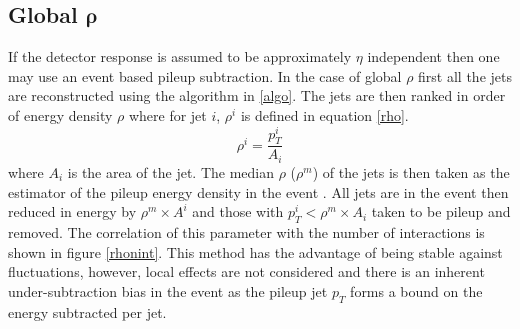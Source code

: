 \subsection{Global $\boldsymbol{\rho}$}
If the detector response is assumed 
to be approximately $\eta$ independent then one may use an event based pileup subtraction. In 
the case of global $\rho$ first all the jets are reconstructed using the algorithm in 
\ref{algo}. The jets are then ranked in order of energy density $\rho$ where for jet 
$i$, $\rho^i$ is defined in equation \ref{rho}.
\begin{equation}
\label{rho}
\rho^i = \frac{p^i_{T}}{A_i} 
\end{equation}
where $A_i$ 
is the area of the jet. The median $\rho$ ($\rho^m$) of the jets is then 
taken as the estimator of the pileup energy density in the event \cite{jetarea}. All jets 
are in the event then reduced in energy by $\rho^m \times A^i$ and those with 
$p_{T}^i < \rho^m \times A_i$ taken to be pileup and removed. The correlation of this 
parameter with the number of interactions is shown in figure \ref{rhonint}. This method has the 
advantage of being stable against fluctuations, however, local effects are not considered and there is 
an inherent under-subtraction bias in the event as the pileup jet $p_{T}$ forms a bound 
on the energy subtracted per jet.
